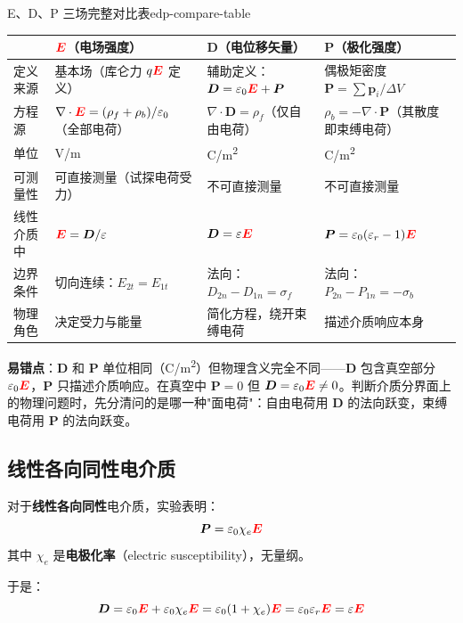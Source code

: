 \documentclass[11pt,a4paper,openany,oneside]{book}
\newcommand{\vecE}{\textcolor{red}{\vect{E}}}
\newcommand{\eps}{\varepsilon}
\newcommand{\vect}[1]{\bm{#1}}
\newcommand{\divg}{\nabla\cdot}
\begin{document}
\begin{tip}{E、D、P 三场完整对比表}{edp-compare-table}
\begin{center}
\small
\begin{tabular}{@{}>{\raggedright\arraybackslash}p{2.2cm}>{\raggedright\arraybackslash}p{3.6cm}>{\raggedright\arraybackslash}p{3.2cm}>{\raggedright\arraybackslash}p{3.6cm}@{}}
\toprule
 & $\vecE$（电场强度） & $\vect{D}$（电位移矢量） & $\vect{P}$（极化强度） \\
\midrule
定义来源 & 基本场（库仑力 $q\vecE$ 定义） & 辅助定义：$\vect{D} = \eps_0\vecE + \vect{P}$ & 偶极矩密度 $\vect{P} = \sum\vect{p}_i/\Delta V$ \\
\midrule
方程源 & $\divg\vecE = (\rho_f+\rho_b)/\eps_0$（全部电荷） & $\divg\vect{D} = \rho_f$（仅自由电荷） & $\rho_b = -\divg\vect{P}$（其散度即束缚电荷） \\
\midrule
单位 & \si{V/m} & \si{C/m^2} & \si{C/m^2} \\
\midrule
可测量性 & 可直接测量（试探电荷受力） & 不可直接测量 & 不可直接测量 \\
\midrule
线性介质中 & $\vecE = \vect{D}/\eps$ & $\vect{D} = \eps\vecE$ & $\vect{P} = \eps_0(\eps_r-1)\vecE$ \\
\midrule
边界条件 & 切向连续：$E_{2t}=E_{1t}$ & 法向：$D_{2n}-D_{1n}=\sigma_f$ & 法向：$P_{2n}-P_{1n}=-\sigma_b$ \\
\midrule
物理角色 & 决定受力与能量 & 简化方程，绕开束缚电荷 & 描述介质响应本身 \\
\bottomrule
\end{tabular}
\end{center}

\textbf{易错点}：$\vect{D}$ 和 $\vect{P}$ 单位相同（\si{C/m^2}）但物理含义完全不同——$\vect{D}$ 包含真空部分 $\eps_0\vecE$，$\vect{P}$ 只描述介质响应。在真空中 $\vect{P}=0$ 但 $\vect{D}=\eps_0\vecE\neq 0$。判断介质分界面上的物理问题时，先分清问的是哪一种"面电荷"：自由电荷用 $\vect{D}$ 的法向跃变，束缚电荷用 $\vect{P}$ 的法向跃变。
\end{tip}

\subsection{线性各向同性电介质}

对于\textbf{线性各向同性}电介质，实验表明：
\[
\vect{P} = \eps_0\chi_e \vecE
\]
其中 $\chi_e$ 是\textbf{电极化率}（electric susceptibility），无量纲。

于是：
\[
\vect{D} = \eps_0\vecE + \eps_0\chi_e\vecE = \eps_0(1+\chi_e)\vecE = \eps_0\eps_r\vecE = \eps\vecE
\]
\end{document}
